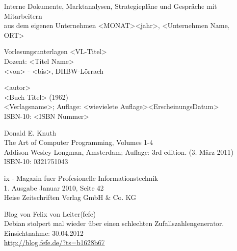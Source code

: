 \newpage

\markboth{}{}%
\renewcommand{\baselinestretch}{.90}

\begin{thebibliography}{20}
	Interne Dokumente, Marktanalysen, Strategiepläne und Gespräche mit Mitarbeitern\\
	aus dem eigenen Unternehmen
	<MONAT><jahr>, <Unternehmen Name, ORT>

	Vorlesungsunterlagen <VL-Titel> \\
	Dozent: <Titel Name> \\
	<von> - <bis>,  DHBW-Lörrach

	<autor> \\
	<Buch Titel> (1962)\\
	<Verlagsname>; Auflage: <wievielete Auflage><ErscheinungsDatum> \\
	ISBN-10: <ISBN Nummer>
	
	Donald E. Knuth\\
	The Art of Computer Programming, Volumes 1-4\\
	Addison-Wesley Longman, Amsterdam; Auflage: 3rd edition. (3. März 2011)\\
	ISBN-10: 0321751043




	ix - Magazin fuer Profesionelle Informationstechnik  \\
	1. Ausgabe Januar 2010, Seite 42\\
	Heise Zeitschriften Verlag GmbH \& Co. KG 

	Blog von Felix von Leiter(fefe)\\
	Debian stolpert mal wieder über einen schlechten Zufallszahlengenerator.  \\
	Einsichtnahme: 30.04.2012  \\
	\url{http://blog.fefe.de/?ts=b1628b67}
   
 

\end{thebibliography}
